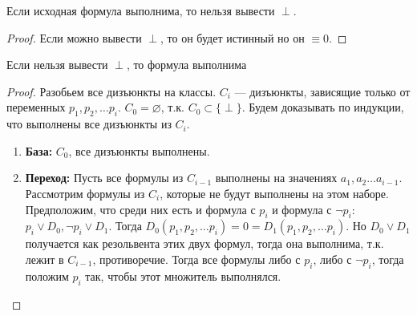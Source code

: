 \begin{theorem}
    Если исходная формула выполнима, то нельзя вывести $\perp$.
\end{theorem}
\begin{proof}
    Если можно вывести $\perp$, то он будет истинный но он $\equiv 0$.
\end{proof}

\begin{theorem}[О полноте]
    Если нельзя вывести $\perp$, то формула выполнима
\end{theorem}
\begin{proof}
    Разобьем все дизъюнкты на классы. $C_i$ --- дизъюнкты, зависящие только от переменных $p_1, p_2, \dots p_i$. $C_0 = \varnothing$, т.к. $C_0 \subset \{\perp\}$. Будем доказывать по индукции, что выполнены все дизъюнкты из $C_i$.
    \begin{enumerate}
        \item[] \textbf{База:} $C_0$, все дизъюнкты выполнены.
        \item[] \textbf{Переход:} Пусть все формулы из $C_{i-1}$ выполнены на значениях $a_1, a_2 \dots a_{i-1}$. Рассмотрим формулы из $C_i$, которые не будут выполнены на этом наборе. Предположим, что среди них есть и формула с $p_i$ и формула с $\neg p_i$: $p_i \vee D_0, \neg p_i \vee D_1$. Тогда $D_0(p_1, p_2, \dots p_i) = 0 = D_1(p_1, p_2, \dots p_i)$. Но $D_0 \vee D_1$ получается как резольвента этих двух формул, тогда она выполнима, т.к. лежит в $C_{i-1}$, противоречие. Тогда все формулы либо с $p_i$, либо с $\neg p_i$, тогда положим $p_i$ так, чтобы этот множитель выполнялся.
    \end{enumerate}
\end{proof}